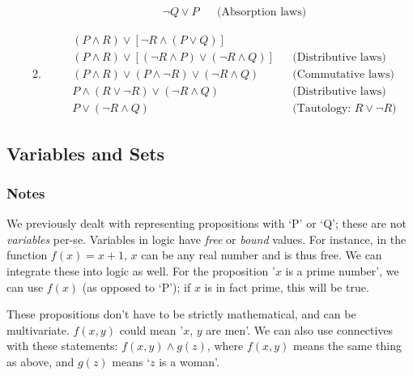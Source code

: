 \documentclass[a4paper, 11pt]{article}
\begin{document}
\begin{enumerate}
\begin{enumerate}
\begin{align*}
                   & \neg Q \vee P                                 &  & \text{(Absorption laws)}
                \end{align*}
          \item \begin{align*}
                   & (P \wedge R) \vee [\neg R \wedge (P \vee Q)]                                                          \\
                   & (P \wedge R) \vee [(\neg R \wedge P) \vee (\neg R \wedge Q)] &  & \text{(Distributive laws)}          \\
                   & (P \wedge R) \vee (P \wedge \neg R) \vee (\neg R \wedge Q)   &  & \text{(Commutative laws)}           \\
                   & P \wedge (R \vee \neg R) \vee (\neg R \wedge Q)              &  & \text{(Distributive laws)}          \\
                   & P \vee (\neg R \wedge Q)                                     &  & \text{(Tautology: $R \vee \neg R$)}
                \end{align*}
        \end{enumerate}
\end{enumerate}


\clearpage

\subsection{Variables and Sets}
\subsubsection{Notes}

We previously dealt with representing propositions with `P' or `Q'; these are not \textit{variables} per-se. Variables in logic have \textit{free} or \textit{bound} values. For instance, in the function $f(x)=x+1$, $x$ can be any real number and is thus free. We can integrate these into logic as well. For the proposition '$x$ is a prime number', we can use $f(x)$ (as opposed to `P'); if $x$ is in fact prime, this will be true.

These propositions don't have to be strictly mathematical, and can be multivariate. $f(x, y)$ could mean '$x$, $y$ are men'. We can also use connectives with these statements: $f(x,y) \wedge g(z)$, where $f(x,y)$ means the same thing as above, and $g(z)$ means `$z$ is a woman'.
\end{document}
